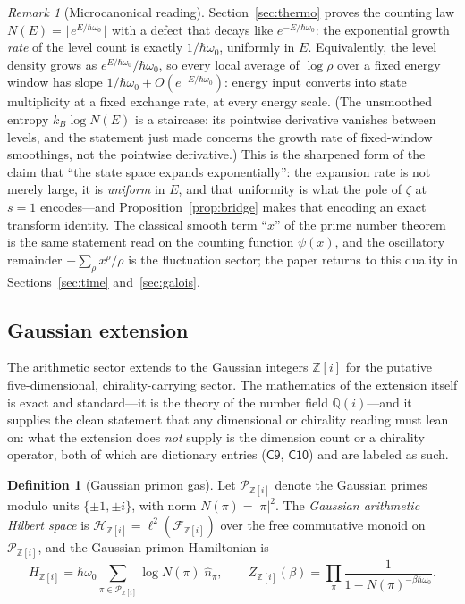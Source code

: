 \documentclass[11pt,a4paper]{article}
\theoremstyle{plain}
\theoremstyle{definition}
\newtheorem{definition}[theorem]{Definition}
\theoremstyle{remark}
\newtheorem{remark}[theorem]{Remark}
\newcommand{\Zz}{\mathbb{Z}}
\newcommand{\Qq}{\mathbb{Q}}
\newcommand{\Hil}{\mathcal{H}}
\begin{document}
\begin{remark}[Microcanonical reading]
Section~\ref{sec:thermo} proves the counting law $N(E)=\lfloor e^{E/\hbar\omega_{0}}\rfloor$
with a defect that decays like $e^{-E/\hbar\omega_{0}}$: the exponential growth \emph{rate} of
the level count is exactly $1/\hbar\omega_{0}$, uniformly in $E$. Equivalently, the level
density grows as $e^{E/\hbar\omega_{0}}/\hbar\omega_{0}$, so every local average of $\log\rho$ over
a fixed energy window has slope $1/\hbar\omega_{0}+O(e^{-E/\hbar\omega_{0}})$: energy input
converts into state multiplicity at a fixed exchange rate, at every energy scale. (The
unsmoothed entropy $k_{B}\log N(E)$ is a staircase: its pointwise derivative vanishes between
levels, and the statement just made concerns the growth rate of fixed-window smoothings, not
the pointwise derivative.) This is the sharpened form of the claim that ``the state space
expands exponentially'': the expansion rate is not
merely large, it is \emph{uniform} in $E$, and that uniformity is what the pole of $\zeta$ at
$s=1$ encodes---and Proposition~\ref{prop:bridge} makes that encoding an exact
transform identity. The classical smooth term ``$x$'' of the prime number theorem is the same
statement read on the counting function $\psi(x)$, and the oscillatory remainder
$-\sum_{\rho}x^{\rho}/\rho$ is the fluctuation sector; the paper returns
to this duality in Sections~\ref{sec:time} and~\ref{sec:galois}.
\end{remark}

\subsection{Gaussian extension}

The arithmetic sector extends to the Gaussian integers $\Zz[i]$ for the putative
five-dimensional, chirality-carrying sector. The mathematics of the extension itself is exact
and standard---it is the theory of the number field $\Qq(i)$---and it supplies the clean
statement that any dimensional or chirality reading must lean on: what the extension does
\emph{not} supply is the dimension count or a chirality operator, both of which are dictionary
entries ($\mathsf{C9}$, $\mathsf{C10}$) and are labeled as such.

\begin{definition}[Gaussian primon gas]\label{def:gaussian}
Let $\mathcal{P}_{\Zz[i]}$ denote the Gaussian primes modulo units $\{\pm1,\pm i\}$, with norm
$N(\pi)=|\pi|^{2}$. The \emph{Gaussian arithmetic Hilbert space} is
$\Hil_{\Zz[i]}=\ell^{2}(\mathcal{F}_{\Zz[i]})$ over the free commutative monoid on
$\mathcal{P}_{\Zz[i]}$, and the Gaussian primon Hamiltonian is
\begin{equation}
H_{\Zz[i]}=\hbar\omega_{0}\sum_{\pi\in\mathcal{P}_{\Zz[i]}}\log N(\pi)\;\hat n_{\pi},
\qquad
Z_{\Zz[i]}(\beta)=\prod_{\pi}\frac{1}{1-N(\pi)^{-\beta\hbar\omega_{0}}}.
\end{equation}
\end{definition}
\end{document}
